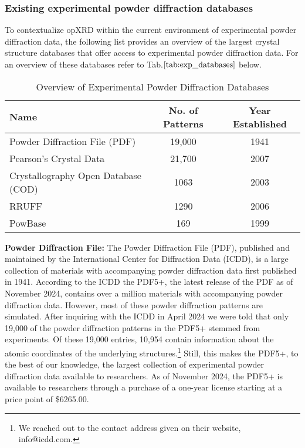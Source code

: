 \pagebreak

\subsubsection*{Existing experimental powder diffraction databases}
To contextualize opXRD within the current environment of experimental powder diffraction data, the following list provides an overview of the largest crystal structure databases that offer access to experimental powder diffraction data. For an overview of these databases refer to Tab.$\eqref{tab:exp_databases}$ below.\\

\begin{table}[!htb]
\centering
\caption{Overview of Experimental Powder Diffraction Databases}
\label{tab:exp_databases}
\begin{tabular}{@{}lcc@{}}
\toprule
\textbf{Name}                          & \textbf{No. of Patterns} & \textbf{Year Established} \\
\midrule
Powder Diffraction File (PDF)          & 19,000                  & 1941                      \\
Pearson's Crystal Data                  & 21,700                  & 2007        \\
Crystallography Open Database (COD)    & 1063                    & 2003                      \\
RRUFF                                  & 1290                    & 2006                      \\
PowBase                                & 169                     & 1999                      \\
\bottomrule
\end{tabular}
\end{table}

\textbf{Powder Diffraction File:} \cite{PDFWeb} The Powder Diffraction File (PDF), published and maintained by the International Center for Diffraction Data (ICDD), is a large collection of materials with accompanying powder diffraction data first published in 1941\cite{GatesRector2019}. According to the ICDD the PDF5+, the latest release of the PDF as of November 2024, contains over a million materials with accompanying powder diffraction data. However, most of these powder diffraction patterns are simulated. After inquiring with the ICDD in April 2024 we were told that only 19,000 of the powder diffraction patterns in the PDF5+ stemmed from experiments. Of these 19,000 entries, 10,954 contain information about the atomic coordinates of the underlying structures.\footnote{We reached out to the contact address given on their website, info@icdd.com.} Still, this makes the PDF5+, to the best of our knowledge, the largest collection of experimental powder diffraction data available to researchers. As of November 2024, the PDF5+ is available to researchers through a purchase of a one-year license starting at a price point of \$6265.00.\\


